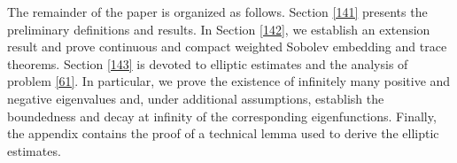 \documentclass[reqno, 11pt, a4paper]{amsart}
\numberwithin{equation}{section}
\newcommand{\iwe}{ \tau}
\newcommand{\wghtv}{\mathtt{V}}
\begin{document}


%



\medskip

The remainder of the paper is organized as follows. Section \ref{141} presents the preliminary definitions and results. In Section \ref{142}, we establish an extension result and prove continuous and compact weighted Sobolev embedding and trace theorems. Section \ref{143} is devoted to elliptic estimates and the analysis of problem \eqref{61}. In particular, we prove the existence of infinitely many positive and negative eigenvalues and, under additional assumptions, establish the boundedness and decay at infinity of the corresponding eigenfunctions. Finally, the appendix contains the proof of a technical lemma used to derive the elliptic estimates.
  
   


    
    
    
    
\end{document}
